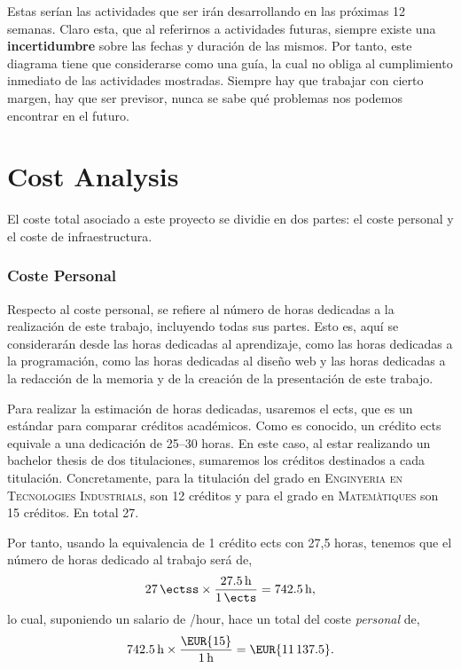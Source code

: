 Estas serían las actividades que ser irán desarrollando en las próximas 12
semanas. Claro esta, que al referirnos a actividades futuras, siempre existe una
\textbf{incertidumbre} sobre las fechas y duración de las mismos. Por tanto,
este diagrama tiene que considerarse como una guía, la cual no obliga al
cumplimiento inmediato de las actividades mostradas. Siempre hay que trabajar
con cierto margen, hay que ser previsor, nunca se sabe qué problemas nos podemos
encontrar en el futuro.



\section{Cost Analysis}\label{sec:cost}

El coste total asociado a este proyecto se dividie en dos partes: el coste
personal y el coste de infraestructura.

\subsubsection{Coste Personal}

Respecto al coste personal, se refiere al número de horas dedicadas a la
realización de este trabajo, incluyendo todas sus partes. Esto es, aquí se
considerarán desde las horas dedicadas al aprendizaje, como las horas dedicadas
a la programación, como las horas dedicadas al diseño web y las horas dedicadas
a la redacción de la memoria y de la creación de la presentación de este
trabajo.

Para realizar la estimación de horas dedicadas, usaremos el \gls{ects}, que es
un estándar para comparar créditos académicos. Como es conocido, un crédito
\gls{ects} equivale a una dedicación de 25--30 horas. En este caso, al estar
realizando un bachelor thesis de dos titulaciones, sumaremos los créditos
destinados a cada titulación. Concretamente, para la titulación del grado en
\textsc{Enginyeria en Tecnologies Industrials}, son 12 créditos y para el grado
en \textsc{Matemàtiques} son 15 créditos. En total \SI{27}{\ectss}.

Por tanto, usando la equivalencia de 1 crédito \gls{ects} con 27,5 horas,
tenemos que el número de horas dedicado al trabajo será de,
\begin{equation}
  \SI{27}{\ectss} \times \frac{\SI{27.5}{\hour}}{\SI{1}{\ects}} =
  \SI{742.5}{\hour},
\end{equation}
lo cual, suponiendo un salario de /hour, hace un total del coste
\emph{personal} de,
\begin{equation}
  \SI{742.5}{\hour} \times \frac{\text{\EUR{15}}}{\SI{1}{\hour}} =
  \text{\EUR{\num{11137.5}}}.
\end{equation}

